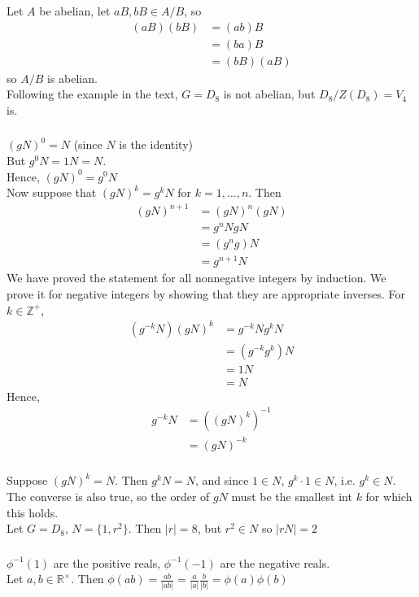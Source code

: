\documentclass{article}
\newcommand{\ints}{\mathbb{Z}}
\newcommand{\reals}{\mathbb{R}}
\newcommand{\set}[1]{ \{ #1 \} }
\newcommand{\abs}[1]{| #1 |}
\newcommand{\phiinv}{\phi^{-1}}
\begin{document}
\subsubsection{}\label{ex1p3}
Let $A$ be abelian, let $aB,bB \in A/B$, so
\begin{align*}
(aB)(bB) &= (ab)B\\
&= (ba)B\\
&= (bB)(aB)
\end{align*}
so $A/B$ is abelian.\\
Following the example in the text, $G=D_8$ is not abelian, but $D_8/Z(D_8) = V_4$ is.
\subsubsection{}\label{ex1p4}
$(gN)^0 = N$ (since $N$ is the identity)\\
But $g^0N = 1N =N$.\\
Hence, $(gN)^0 = g^0N$\\
Now suppose that $(gN)^k = g^kN$ for $k=1,\ldots,n$. Then
\begin{align*}
(gN)^{n+1} &= (gN)^n(gN)\\
&= g^nNgN\\
&= (g^ng)N\\
&= g^{n+1}N
\end{align*}
We have proved the statement for all nonnegative integers by induction. We prove it for negative integers by showing that they are appropriate inverses. For $k\in\ints^{+}$,
\begin{align*}
(g^{-k}N)(gN)^k &= g^{-k}Ng^kN\\
&= (g^{-k}g^k)N\\
&= 1N\\
&= N
\end{align*}
Hence,
\begin{align*}
g^{-k}N &= ((gN)^k)^{-1}\\
&= (gN)^{-k}
\end{align*}
\subsubsection{}\label{ex1p5}
Suppose $(gN)^k = N$. Then $g^kN = N$, and since $1\in N$, $g^k\cdot 1 \in N$, i.e. $g^k \in N$. The converse is also true, so the order of $gN$ must be the smallest int $k$ for which this holds.\\
Let $G=D_8$, $N=\set{1,r^2}$. Then $\abs{r} = 8$, but $r^2 \in N$ so $\abs{rN} =2$
\subsubsection{}\label{ex1p6}
$\phiinv(1)$ are the positive reals, $\phiinv(-1)$ are the negative reals.\\
Let $a,b\in \reals^{\times}$. Then $\phi(ab) = \frac{ab}{\abs{ab}} = \frac{a}{\abs{a}}\frac{b}{\abs{b}} = \phi(a)\phi(b)$
\end{document}
